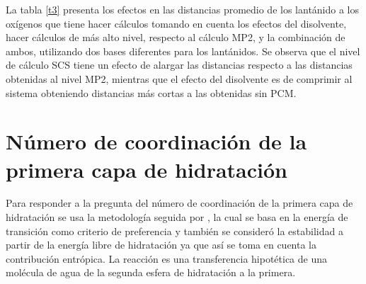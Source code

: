 La tabla \ref{t3} presenta los efectos en las distancias promedio de 
los lant\'anido a los ox\'igenos que tiene hacer c\'alculos tomando
en cuenta los efectos del disolvente, hacer c\'alculos de m\'as alto
nivel, respecto al c\'alculo MP2, y la combinaci\'on de ambos, 
utilizando dos bases diferentes para los lant\'anidos. Se  observa 
que el nivel de c\'alculo SCS tiene un efecto de alargar las 
distancias respecto a las distancias obtenidas al nivel MP2, mientras 
que el efecto del disolvente es de comprimir al sistema obteniendo 
distancias m\'as cortas a las obtenidas sin PCM.


\section{N\'umero de coordinaci\'on de la primera capa de 
hidrataci\'on}

Para responder a la pregunta del n\'umero de coordinaci\'on de la 
primera capa de hidrataci\'on se usa la metodolog\'ia seguida por
\cite{Ciup2010}, la cual se basa en la energ\'ia de transici\'on como
criterio de preferencia y tambi\'en se consider\'o la estabilidad a
partir de la energ\'ia libre de hidrataci\'on ya que as\'i se toma
en cuenta la contribuci\'on entr\'opica. La reacci\'on es una 
transferencia hipot\'etica de una mol\'ecula de agua de la segunda 
esfera de hidrataci\'on a la primera.

